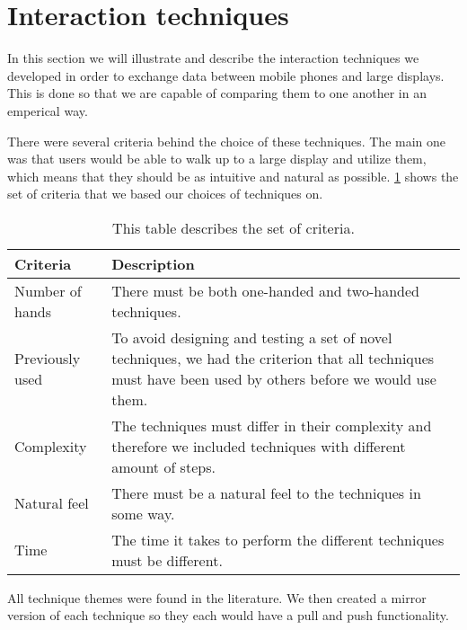 \section{Interaction techniques} \label{sec:techniques}
In this section we will illustrate and describe the interaction techniques we developed in order to exchange data between mobile phones and large displays.
This is done so that we are capable of comparing them to one another in an emperical way.

There were several criteria behind the choice of these techniques. 
The main one was that users would be able to walk up to a large display and utilize them, which means that they should be as intuitive and natural as possible. 
\cref{tab:techniqueCriteria} shows the set of criteria that we based our choices of techniques on.

\begin{table}[H]
	\centering
	\begin{tabular}{|p{}|p{}|}
		\hline
		\rowcolor[HTML]{9B9B9B} 
		\textbf{Criteria} & \textbf{Description} \\ \hline
		Number of hands & There must be both one-handed and two-handed techniques. \\ \hline
		Previously used & To avoid designing and testing a set of novel techniques, we had the criterion that all techniques must have been used by others before we would use them. \\ \hline
		Complexity & The techniques must differ in their complexity and therefore we included techniques with different amount of steps. \\ \hline
		Natural feel & There must be a natural feel to the techniques in some way. \\ \hline
		Time & The time it takes to perform the different techniques must be different. \\ \hline
	\end{tabular}
	\caption{This table describes the set of criteria.}
	\label{tab:techniqueCriteria}
\end{table}



All technique themes were found in the literature.
We then created a mirror version of each technique so they each would have a pull and push functionality.
